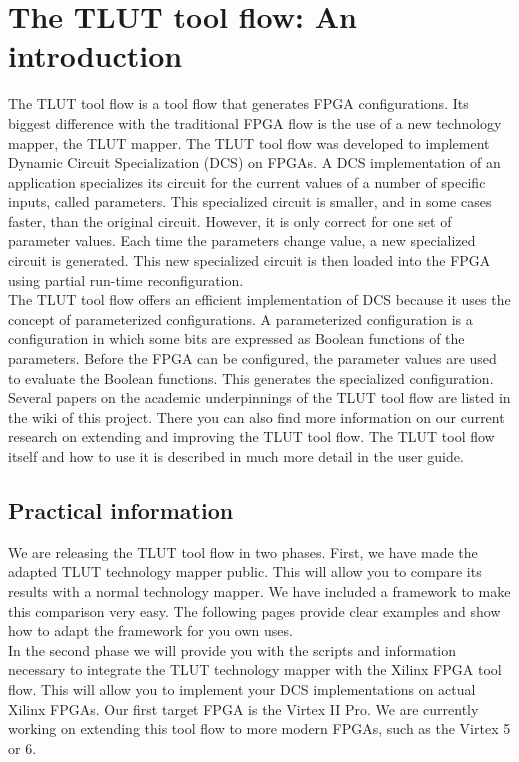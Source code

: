 \documentclass[a4paper,oneside]{memoir}
\begin{document}
\let\clearforchapter\par %
\chapter{The TLUT tool flow: An introduction}

The TLUT tool flow is a tool flow that generates FPGA configurations. Its biggest difference with the traditional FPGA flow is the use of a new technology mapper, the TLUT mapper. The TLUT tool flow was developed to implement Dynamic Circuit Specialization (DCS) on FPGAs. A DCS implementation of an application specializes its circuit for the current values of a number of specific inputs, called parameters. This specialized circuit is smaller, and in some cases faster, than the original circuit. However, it is only correct for one set of parameter values. Each time the parameters change value, a new specialized circuit is generated. This new specialized circuit is then loaded into the FPGA using partial run-time reconfiguration.\\

The TLUT tool flow offers an efficient implementation of DCS because it uses the concept of parameterized configurations. A parameterized configuration is a configuration in which some bits are expressed as Boolean functions of the parameters. Before the FPGA can be configured, the parameter values are used to evaluate the Boolean functions. This generates the specialized configuration. Several papers on the academic underpinnings of the TLUT tool flow are listed in the wiki of this project. There you can also find more information on our current research on extending and improving the TLUT tool flow. The TLUT tool flow itself and how to use it is described in much more detail in the user guide.

\section{Practical information}

We are releasing the TLUT tool flow in two phases. First, we have made the adapted TLUT technology mapper public. This will allow you to compare its results with a normal technology mapper. We have included a framework to make this comparison very easy. The following pages provide clear examples and show how to adapt the framework for you own uses.\\

In the second phase we will provide you with the scripts and information necessary to integrate the TLUT technology mapper with the Xilinx FPGA tool flow. This will allow you to implement your DCS implementations on actual Xilinx FPGAs. Our first target FPGA is the Virtex II Pro. We are currently working on extending this tool flow to more modern FPGAs, such as the Virtex 5 or 6.
\end{document}
